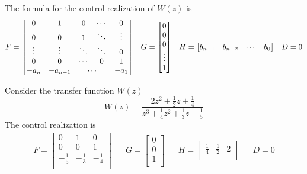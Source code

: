 The formula for the control realization of $W(z)$ is
\begin{align*}
    F = \begin{bmatrix}
        0 & 1 & 0 & \cdots & 0\\
        0& 0 & 1 & \ddots & \vdots \\
        \vdots & \vdots & \ddots & \ddots & 0\\
        0 & 0 & \cdots & 0 & 1\\
        -a_n & -a_{n-1} & \multicolumn{2}{c}{\cdots} & -a_1\\
    \end{bmatrix}
    &&
    G = \begin{bmatrix}
        0\\
        0\\
        0\\
        \vdots\\
        1\\
    \end{bmatrix}
    &&
    H = \begin{bmatrix}
        b_{n-1} & b_{n-2} & \cdots & b_0\\
    \end{bmatrix}
    &&
    D = 0
\end{align*}
\begin{example}
    Consider the transfer function $W(z)$
    \[ W(z) = \frac{2z^2 + \frac{1}{2}z + \frac{1}{4}}{z^3 + \frac{1}{4}z^2 + \frac{1}{3}z + \frac{1}{5}} \]
    The control realization is
    \begin{align*}
        F = \begin{bmatrix}
            0 & 1 & 0\\
            0 & 0 & 1\\
            -\frac{1}{5} & -\frac{1}{3} & -\frac{1 }{4}\\
        \end{bmatrix}
        &&
        G = \begin{bmatrix}
            0\\
            0\\
            1\\
        \end{bmatrix}
        &&
        H = \begin{bmatrix}
            \frac{1}{4} & \frac{1}{2} & 2\\
        \end{bmatrix}
        &&
        D = 0
    \end{align*}
\end{example}

